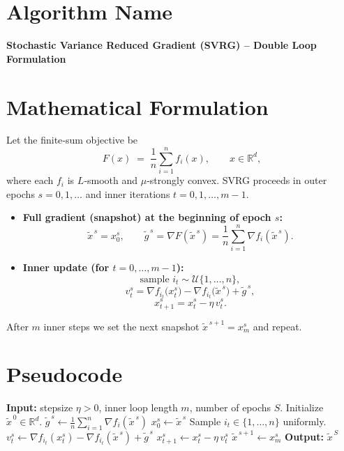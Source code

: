 \documentclass{article}
\newcommand{\R}{\mathbb{R}}
\begin{document}
\section*{Algorithm Name}
\textbf{Stochastic Variance Reduced Gradient (SVRG) – Double Loop Formulation}

\section*{Mathematical Formulation}
Let the finite‑sum objective be 
\[
F(x)\;=\;\frac{1}{n}\sum_{i=1}^{n}f_i(x),\qquad x\in\R^{d},
\]
where each $f_i$ is $L$‑smooth and $\mu$‑strongly convex.  
SVRG proceeds in outer epochs $s=0,1,\dots$ and inner iterations $t=0,1,\dots,m-1$.

\begin{itemize}
\item \textbf{Full gradient (snapshot) at the beginning of epoch $s$:}
\[
\tilde{x}^{\,s}=x_{0}^{s},\qquad 
\tilde{g}^{\,s}= \nabla F(\tilde{x}^{\,s})=\frac{1}{n}\sum_{i=1}^{n}\nabla f_i(\tilde{x}^{\,s}).
\]

\item \textbf{Inner update (for $t=0,\dots,m-1$):}
\[
\text{sample } i_t\sim\mathcal{U}\{1,\dots,n\},
\]
\[
v_t^{s}= \nabla f_{i_t}\bigl(x_{t}^{s}\bigr)-\nabla f_{i_t}\bigl(\tilde{x}^{\,s}\bigr)+\tilde{g}^{\,s},
\]
\[
x_{t+1}^{s}=x_{t}^{s}-\eta\,v_t^{s}.
\]
\end{itemize}
After $m$ inner steps we set the next snapshot $\tilde{x}^{\,s+1}=x_{m}^{s}$ and repeat.

\section*{Pseudocode}
\begin{algorithm}[H]
\caption{SVRG}
\begin{algorithmic}[1]
\STATE \textbf{Input:} stepsize $\eta>0$, inner loop length $m$, number of epochs $S$.
\STATE Initialize $ \tilde{x}^{\,0}\in\R^{d}$.
    \STATE $\tilde{g}^{\,s}\gets \frac{1}{n}\sum_{i=1}^{n}\nabla f_i(\tilde{x}^{\,s})$ \hfill{}
    \STATE $x_{0}^{s}\gets \tilde{x}^{\,s}$
        \STATE Sample $i_t\in\{1,\dots,n\}$ uniformly.
        \STATE $v_t^{s}\gets \nabla f_{i_t}(x_{t}^{s})-\nabla f_{i_t}(\tilde{x}^{\,s})+\tilde{g}^{\,s}$
        \STATE $x_{t+1}^{s}\gets x_{t}^{s}-\eta\,v_t^{s}$
    \ENDFOR
    \STATE $\tilde{x}^{\,s+1}\gets x_{m}^{s}$
\ENDFOR
\STATE \textbf{Output:} $\tilde{x}^{\,S}$
\end{algorithmic}
\end{algorithm}
\end{document}
